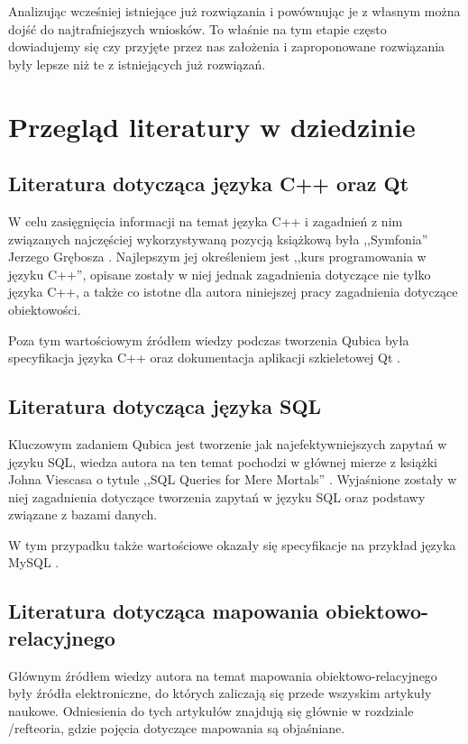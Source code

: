 \documentclass[12pt]{report}
\begin{document}
Analizując wcześniej istniejące już rozwiązania i powównując je z własnym można dojść do najtrafniejszych wniosków. To właśnie na tym etapie często dowiadujemy się czy
przyjęte przez nas założenia i zaproponowane rozwiązania były lepsze niż te z istniejących już rozwiązań. 

\section{Przegląd literatury w dziedzinie}

\subsection{Literatura dotycząca języka C++ oraz Qt}

W celu zasięgnięcia informacji na temat języka C++ i zagadnień z nim związanych najczęściej wykorzystywaną pozycją książkową była ,,Symfonia'' Jerzego Grębosza \cite{symfonia}.
Najlepszym jej określeniem jest ,,kurs programowania w języku C++'', opisane zostały w niej jednak zagadnienia dotyczące nie tylko języka C++, a także co istotne dla
autora niniejszej pracy zagadnienia dotyczące obiektowości.

Poza tym wartościowym źródłem wiedzy podczas tworzenia Qubica była specyfikacja języka C++ \cite{cpp} oraz dokumentacja aplikacji szkieletowej Qt \cite{qt}.

\subsection{Literatura dotycząca języka SQL}

Kluczowym zadaniem Qubica jest tworzenie jak najefektywniejszych zapytań w języku SQL, wiedza autora na ten temat pochodzi w głównej mierze z książki Johna Viescasa o
tytule ,,SQL Queries for Mere Mortals'' \cite{sql}. Wyjaśnione zostały w niej zagadnienia dotyczące tworzenia zapytań w języku SQL oraz podstawy związane z bazami danych.

W tym przypadku także wartościowe okazały się specyfikacje na przykład języka MySQL \cite{mysql}.

\subsection{Literatura dotycząca mapowania obiektowo-relacyjnego}

Głównym źródłem wiedzy autora na temat mapowania obiektowo-relacyjnego były źródła elektroniczne, do których zaliczają się przede wszyskim artykuły naukowe. Odniesienia
do tych artykułów znajdują się głównie w rozdziale /ref{teoria}, gdzie pojęcia dotyczące mapowania są objaśniane.
\end{document}
